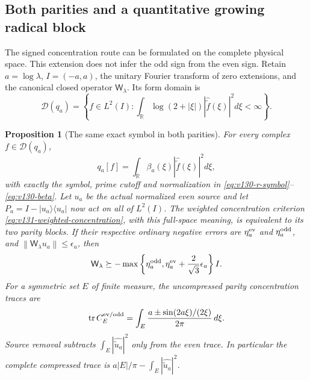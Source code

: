 \documentclass[11pt]{article}
\newtheorem{proposition}[theorem]{Proposition}
\theoremstyle{remark}
\newcommand{\norm}[1]{\left\lVert #1\right\rVert}
\begin{document}
\subsection*{Both parities and a quantitative growing radical block}

The signed concentration route can be formulated on the complete physical
space.  This extension does not infer the odd sign from the even sign.
Retain $a=\log\lambda$, $I=(-a,a)$, the unitary Fourier transform of
zero extensions, and the canonical closed operator $\mathsf W_\lambda$.
Its form domain is
\[
 \mathcal D(q_a)=\left\{f\in L^2(I):
 \int_{\mathbb R}\log(2+|\xi|)
       |\widehat{\widetilde f}(\xi)|^2d\xi<\infty\right\}.
\]

\begin{proposition}[The same exact symbol in both parities]
\label{prop:v135-both-parities}
For every complex $f\in\mathcal D(q_a)$,
\begin{equation}\label{eq:v135-full-symbol}
 q_a[f]=\int_{\mathbb R}\beta_a(\xi)
                    |\widehat{\widetilde f}(\xi)|^2d\xi,
\end{equation}
with exactly the symbol, prime cutoff and normalization in
\eqref{eq:v130-r-symbol}--\eqref{eq:v130-beta}.
Let $u_a$ be the actual normalized even source and let
$P_a=I-|u_a\rangle\langle u_a|$ now act on all of $L^2(I)$.
The weighted concentration criterion
\eqref{eq:v131-weighted-concentration}, with this full-space meaning,
is equivalent to its two parity blocks.  If their respective ordinary
negative errors are $\eta_a^{\rm ev}$ and $\eta_a^{\rm odd}$, and
$\norm{\mathsf W_\lambda u_a}\le\epsilon_a$, then
\begin{equation}\label{eq:v135-full-error}
 \mathsf W_\lambda\succeq-
 \max\left\{\eta_a^{\rm odd},
      \eta_a^{\rm ev}+\frac2{\sqrt3}\epsilon_a\right\}I.
\end{equation}
For a symmetric set $E$ of finite measure, the uncompressed parity
concentration traces are
\begin{equation}\label{eq:v135-parity-traces}
 \operatorname{tr}C_E^{\rm ev/odd}
 =\int_E\frac{a\mathbin{\pm}\sin(2a\xi)/(2\xi)}{2\pi}\,d\xi.
\end{equation}
Source removal subtracts $\int_E|\widehat{\widetilde u_a}|^2$ only
from the even trace.  In particular the complete compressed trace is
$a|E|/\pi-\int_E|\widehat{\widetilde u_a}|^2$.
\end{proposition}
\end{document}
